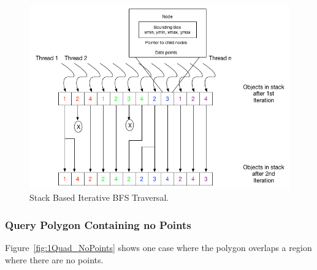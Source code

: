 \begin{figure}[H]
\centering
\vspace{0.5in}
\includegraphics[scale=0.4]{Images/Stack1}
\vspace{0.5in}
\caption{Stack Based Iterative BFS Traversal.}
\label{fig:Stack1}
\end{figure}

\subsubsection{Query Polygon Containing no Points}

Figure~\ref{fig:1Quad_NoPoints} shows one case where the polygon overlaps a region where there are no points. 

